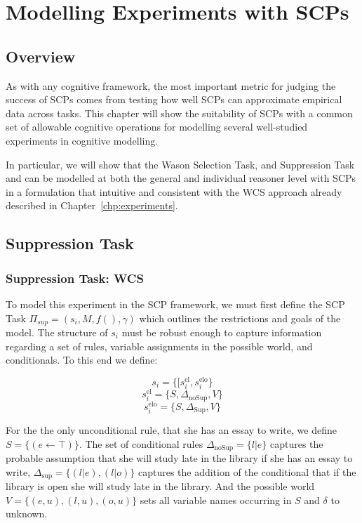 \chapter{Modelling Experiments with SCPs} \label{chp:model}
\section{Overview}
As with any cognitive framework, the most important metric for judging the success of SCPs comes from testing how well SCPs can approximate empirical data across tasks. This chapter will show the suitability of SCPs with a common set of allowable cognitive operations for modelling several well-studied experiments in cognitive modelling.

In particular, we will show that the Wason Selection Task, and Suppression Task and can be modelled at both the general and individual reasoner level with SCPs in a formulation that intuitive and consistent with the WCS approach already described in Chapter~\ref{chp:experiments}.
\section{Suppression Task} \label{sec:supSCP}

\subsection{Suppression Task: WCS}


To model this experiment in the SCP framework, we must first define the SCP Task $\Pi_{sup}=(s_i,M,f(),\gamma)$ which outlines the restrictions and goals of the model. The structure of $s_i$ must be robust enough to capture information regarding a set of rules, variable assignments in the possible world, and conditionals. To this end we define:

\[s_i=\{[s_i^\text{el},s_i^\text{elo}\}\]
\[s_i^\text{el}=\{S,\Delta_\text{noSup}, V\} \]
\[s_i^\text{elo}=\{S,\Delta_\text{Sup}, V\} \]




For the the only unconditional rule, that she has an essay to write, we define $S=\{(e \leftarrow \top)\}$. The set of conditional rules $\Delta_{\text{noSup}}=\{l|e\}$ captures the probable assumption that she will study late in the library if she has an essay to write, $\Delta_{\text{sup}}=\{(l|e),(l|o)\}$ captures the addition of the conditional that if the library is open she will study late in the library. And the possible world $V=\{(e,u),(l,u),(o,u)\}$ sets all variable names occurring in $S$ and $\delta$ to unknown.

